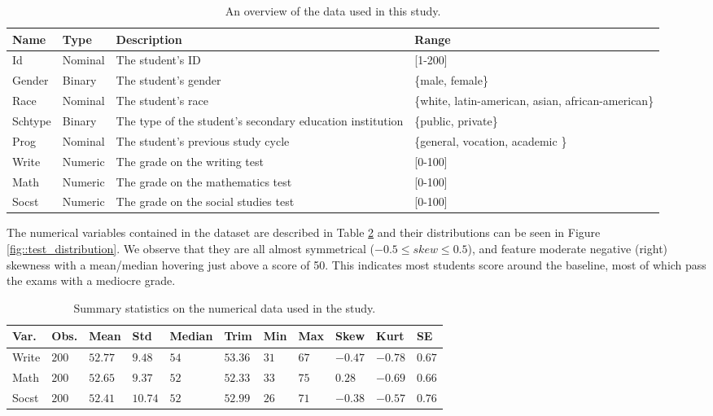 \documentclass[10pt, a4paper]{article}
\begin{document}
	\begin{table}
		\centering
		\begin{tabular}
			{ |p{1cm} p{1cm} p{5cm} p{3cm}| }
			\hline
			\textbf{Name} & \textbf{Type} & \textbf{Description} & \textbf{Range}\\
			\hline
			Id  & Nominal & The student's ID & [1-200] \\
			Gender  & Binary & The student's gender & \{male, female\} \\
			Race  & Nominal & The student's race & \{white, latin-american, asian, african-american\} \\
			Schtype  & Binary & The type of the student's secondary education institution & \{public, private\} \\
			Prog  & Nominal & The student's previous study cycle  & \{general, vocation, academic \} \\
			Write  & Numeric & The grade on the writing test  & [0-100] \\
			Math  & Numeric & The grade on the mathematics test  & [0-100] \\
			Socst  & Numeric & The grade on the social studies test & [0-100] \\
			\hline
		\end{tabular}
		\caption{An overview of the data used in this study.}
		\label{tab::dataset}
	\end{table}
	
	The numerical variables contained in the dataset are described in Table \ref{tab::summary_stats} and their distributions can be seen in Figure \ref{fig::test_distribution}. We observe that they are all almost symmetrical ($-0.5 \leq skew \leq 0.5$), and feature moderate negative (right) skewness with a mean/median hovering just above a score of 50. This indicates most students score around the baseline, most of which pass the exams with a mediocre grade.
	
	\begin{table}
		\centering
		\begin{tabular}
			{ |p{1cm} p{0.5cm} p{0.7cm} p{0.5cm} p{1cm} p{0.7cm} p{0.5cm} p{0.5cm} p{0.5cm} p{0.5cm} p{0.5cm}| }
			\hline
			\textbf{Var.} & \textbf{Obs.} & \textbf{Mean} & \textbf{Std} & \textbf{Median} & \textbf{Trim} & \textbf{Min} & \textbf{Max} & \textbf{Skew} & \textbf{Kurt} & \textbf{SE}\\
			\hline
			Write & $200$ & $52.77$ & $9.48$ & $54$ & $53.36$ & $31$ & $67$ & $-0.47$ & $-0.78$ & $0.67$ \\
			Math & $200$ & $52.65$ & $9.37$ & $52$ & $52.33$ & $33$ & $75$ & $0.28$ & $-0.69$ & $0.66$ \\
			Socst & $200$ & $52.41$ & $10.74$ & $52$ &$ 52.99$ & $26$ & $71$ & $-0.38$ & $-0.57$ & $0.76$ \\
			\hline
		\end{tabular}
		\caption{Summary statistics on the numerical data used in the study.}
		\label{tab::summary_stats}
	\end{table}
\end{document}

